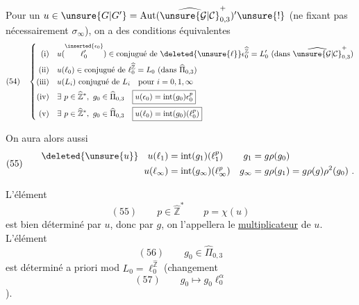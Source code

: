 Pour un $u\in\unsure{G|G'}=\operatorname{Aut}(\widehat{\unsure{\mathcal{G}|\mathcal{C}}}_{0,3}^{+})'\unsure{!}$ (ne fixant pas nécessairement $\sigma_\infty$), on a des conditions équivalentes
\[
(54)\quad
\left\{\begin{aligned}
\text{(i)}\quad &u(\overset{\inserted{\epsilon_0}}{\ell'_0})\in\text{conjugué de }\deleted{\unsure{\ell}}\epsilon_0^{\widehat{\mathbb Z}}=L'_0\ (\text{dans }\widehat{\unsure{\mathcal{G}|\mathcal{C}}}_{0,3}^{+})\\
\text{(ii)}\quad &u(\ell_0)\in\text{conjugué de }\ell_0^{\widehat{\mathbb Z}}=L_0\ (\text{dans }\widehat{\Pi}_{0,3})\\
\text{(iii)}\quad &u(L_i)\text{ conjugué de }L_i\quad\text{pour }i=0,1,\infty\\
\text{(iv)}\quad &\exists\ p\in\widehat{\mathbb Z}^{\ast},\ g_0\in\widehat{\Pi}_{0,3}\quad
\boxed{u(\epsilon_0)=\operatorname{int}(g_0)\epsilon_0^p}\\
\text{(v)}\quad &\exists\ p\in\widehat{\mathbb Z}^{\ast},\ g_0\in\widehat{\Pi}_{0,3}\quad
\boxed{u(\ell_0)=\operatorname{int}(g_0)(\ell_0^p)}
\end{aligned}\right.
\]

On aura alors aussi
\[
(55)\qquad
\begin{aligned}
\deleted{\unsure{u}}\quad u(\ell_1)&=\operatorname{int}(g_1)(\ell_1^p)&
g_1&=g\rho(g_0)\\
u(\ell_\infty)&=\operatorname{int}(g_\infty)(\ell_\infty^p)&
g_\infty&=g\rho(g_1)=g\rho(g)\rho^2(g_0)\ .
\end{aligned}
\]

L'élément 
\[
(55)\qquad p\in\widehat{\mathbb Z}^{\ast}\qquad p=\chi(u)
\]
est bien déterminé par $u$, donc par $g$, on l'appellera le \uline{multiplicateur} de $u$. L'élément 
\[
(56)\qquad g_0\in\widehat{\Pi}_{0,3}
\]
est déterminé a priori mod $L_0=\ell_0^{\widehat{\mathbb Z}}$ (changement
\[
(57)\qquad g_0\longmapsto g_0\ell_0^\alpha
\]
).


